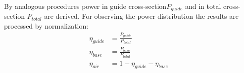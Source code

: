By analogous procedures power in guide cross-section$P_{guide}$ and in total cross-section $P_{total}$ are derived. For observing the power distribution the results are processed by normalization:
\begin{align}
\eta_{guide}&=\frac{P_{guide}}{P_{total}}\\
\eta_{base}&=\frac{P_{base}}{P_{total}}\\
\eta_{air}&=1-\eta_{guide}-\eta_{base}
\end{align}

